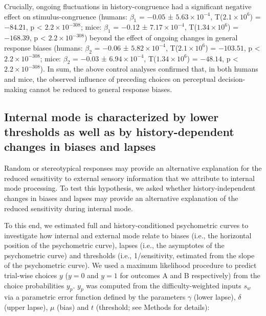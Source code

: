 \documentclass[
]{article}
\begin{document}
Crucially, ongoing fluctuations in history-congruence had a significant
negative effect on stimulus-congruence (humans: \(\beta_1\) = \(-0.05\)
± \(\ensuremath{5.63\times 10^{-4}}\),
T(\(\ensuremath{2.1\times 10^{6}}\)) = \(-84.21\), p < \(\ensuremath{2.2\times 10^{-308}}\); mice:
\(\beta_1\) = \(-0.12\) ± \(\ensuremath{7.17\times 10^{-4}}\),
T(\(\ensuremath{1.34\times 10^{6}}\)) = \(-168.39\), p < \(\ensuremath{2.2\times 10^{-308}}\)) beyond
the effect of ongoing changes in general response biases (humans:
\(\beta_2\) = \(-0.06\) ± \(\ensuremath{5.82\times 10^{-4}}\),
T(\(\ensuremath{2.1\times 10^{6}}\)) = \(-103.51\), p < \(\ensuremath{2.2\times 10^{-308}}\); mice:
\(\beta_2\) = \(-0.03\) ± \(\ensuremath{6.94\times 10^{-4}}\),
T(\(\ensuremath{1.34\times 10^{6}}\)) = \(-48.14\), p < \(\ensuremath{2.2\times 10^{-308}}\)). In sum,
the above control analyses confirmed that, in both humans and mice, the
observed influence of preceding choices on perceptual decision-making
cannot be reduced to general response biases.

\hypertarget{internal-mode-is-characterized-by-lower-thresholds-as-well-as-by-history-dependent-changes-in-biases-and-lapses}{%
\subsection{Internal mode is characterized by lower thresholds as well
as by history-dependent changes in biases and
lapses}\label{internal-mode-is-characterized-by-lower-thresholds-as-well-as-by-history-dependent-changes-in-biases-and-lapses}}

Random or stereotypical responses may provide an alternative explanation
for the reduced sensitivity to external sensory information that we
attribute to internal mode processing. To test this hypothesis, we asked
whether history-independent changes in biases and lapses may provide an
alternative explanation of the reduced sensitivity during internal mode.

To this end, we estimated full and history-conditioned psychometric
curves to investigate how internal and external mode relate to biases
(i.e., the horizontal position of the psychometric curve), lapses (i.e.,
the asymptotes of the psychometric curve) and thresholds (i.e.,
1/sensitivity, estimated from the slope of the psychometric curve). We
used a maximum likelihood procedure to predict trial-wise choices \(y\)
(\(y = 0\) and \(y = 1\) for outcomes A and B respectively) from the
choice probabilities \(y_p\). \(y_p\) was computed from the
difficulty-weighted inputs \(s_w\) via a parametric error function
defined by the parameters \(\gamma\) (lower lapse), \(\delta\) (upper
lapse), \(\mu\) (bias) and \(t\) (threshold; see Methods for details):
\end{document}
